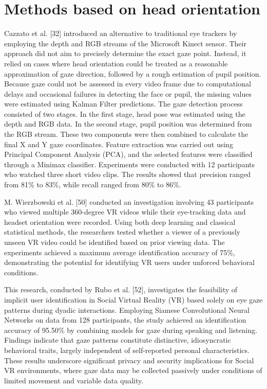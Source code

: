 \documentclass[12pt]{report}
\begin{document}
\section{Methods based on head orientation}

Cazzato et al. [32] introduced an alternative to traditional eye trackers by employing the depth and RGB streams of the Microsoft Kinect sensor.
Their approach did not aim to precisely determine the exact gaze point.
Instead, it relied on cases where head orientation could be treated as a reasonable approximation of gaze direction, followed by a rough estimation of pupil position.
Because gaze could not be assessed in every video frame due to computational delays and occasional failures in detecting the face or pupil, the missing values were estimated using Kalman Filter predictions. 
The gaze detection process consisted of two stages. In the first stage, head pose was estimated using the depth and RGB data. 
In the second stage, pupil position was determined from the RGB stream. 
These two components were then combined to calculate the final X and Y gaze coordinates. 
Feature extraction was carried out using Principal Component Analysis (PCA), and the selected features were classified through a Minimax classifier.
Experiments were conducted with 12 participants who watched three short video clips. 
The results showed that precision ranged from 81\% to 83\%, while recall ranged from 80\% to 86\%.

M. Wierzbowski et al. [50] conducted an investigation involving 43 participants who viewed multiple 360-degree VR videos while their eye-tracking data and headset orientation were recorded.
Using both deep learning and classical statistical methods, the researchers tested whether a viewer of a previously unseen VR video could be identified based on prior viewing data. 
The experiments achieved a maximum average identification accuracy of 75\%, demonstrating the potential for identifying VR users under unforced behavioral conditions.

This research, conducted by Rubo et al. [52], investigates the feasibility of implicit user identification in Social Virtual Reality (VR) based solely on eye gaze patterns during dyadic interactions.
Employing Siamese Convolutional Neural Networks on data from 128 participants, the study achieved an identification accuracy of 95.50\% by combining models for gaze during speaking and listening. 
Findings indicate that gaze patterns constitute distinctive, idiosyncratic behavioral traits, largely independent of self-reported personal characteristics.
These results underscore significant privacy and security implications for Social VR environments, where gaze data may be collected passively under conditions of limited movement and variable data quality.
\end{document}
